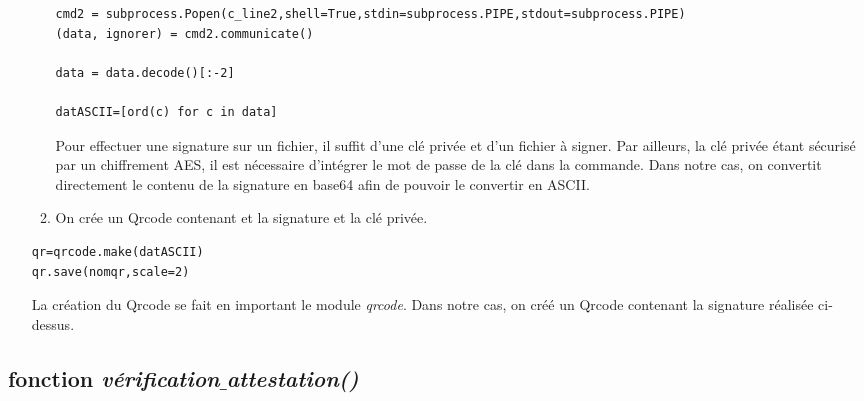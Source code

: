 \documentclass[12pt]{article}
\newcommand{\1}{\mathbbm{1}}
\begin{document}
\begin{enumerate}[label=(\arabic*)]
\begin{enumerate}[label=(\roman*)]
\begin{lstlisting}
cmd2 = subprocess.Popen(c_line2,shell=True,stdin=subprocess.PIPE,stdout=subprocess.PIPE)
(data, ignorer) = cmd2.communicate()	

data = data.decode()[:-2]

datASCII=[ord(c) for c in data]
\end{lstlisting}
\vspace*{7mm}
Pour effectuer une signature sur un fichier, il suffit d'une clé privée et d'un fichier à signer. Par ailleurs, la clé privée étant sécurisé par un chiffrement AES, il est nécessaire d'intégrer le mot de passe de la clé dans la commande. Dans notre cas, on convertit directement le contenu de la signature en base64 afin de pouvoir le convertir en ASCII.

\item On crée un Qrcode contenant et la signature et la clé privée.
\end{enumerate}

\begin{lstlisting}
qr=qrcode.make(datASCII)
qr.save(nomqr,scale=2)
\end{lstlisting}	
\vspace*{7mm}
La création du Qrcode se fait en important le module \textit{qrcode}. Dans notre cas, on créé un Qrcode contenant la signature réalisée ci-dessus. 
	
\end{enumerate}

	
\subsection{fonction \textit{vérification$\_$attestation()}}
\end{document}
